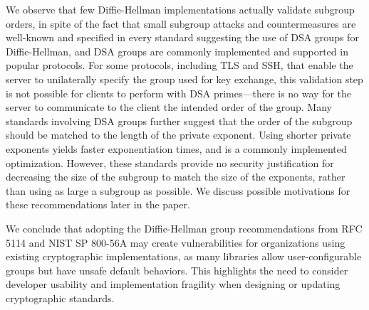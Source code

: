 We observe
that few Diffie-Hellman implementations actually validate subgroup orders, in spite of the fact 
that small subgroup attacks and countermeasures are well-known and specified
in every standard suggesting the use of DSA groups for Diffie-Hellman, and DSA
groups are commonly implemented and supported in popular protocols. For some protocols, including
TLS and SSH, that enable the server to unilaterally specify the group used for
key exchange, this validation step is not possible for clients to perform with
DSA primes---there is no way for the server to communicate to the client the
intended order of the group. Many standards involving DSA groups further
suggest that the order of the subgroup should be matched to the length of the
private exponent.  Using shorter private exponents yields faster exponentiation
times, and is a commonly implemented optimization. However, these standards
provide no security justification for decreasing the size of the subgroup to
match the size of the exponents, rather than using as large a subgroup as
possible. We discuss possible motivations for these recommendations
later in the paper.

We conclude that adopting the Diffie-Hellman group recommendations from RFC
5114 and NIST SP 800-56A may create vulnerabilities for organizations using
existing cryptographic implementations, as many libraries allow
user-configurable groups but have unsafe default behaviors.  This highlights the
need to consider developer usability and implementation fragility when designing
or updating cryptographic standards.

